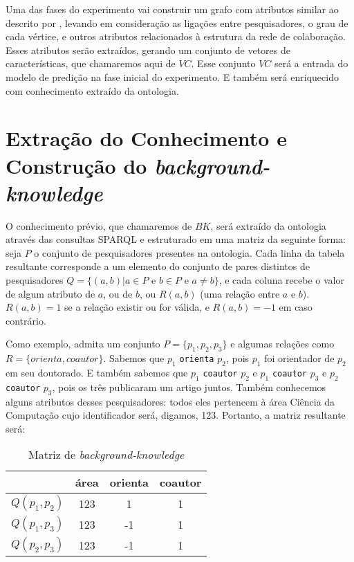 Uma das fases do experimento vai construir um grafo com atributos similar ao descrito por \citet{Cervantes2014}, levando em consideração as ligações entre pesquisadores, o grau de cada vértice, e outros atributos relacionados à estrutura da rede de colaboração. Esses atributos serão extraídos, gerando um conjunto de vetores de características, que chamaremos aqui de $VC$. Esse conjunto $VC$ será a entrada do modelo de predição na fase inicial do experimento. E também será enriquecido com conhecimento extraído da ontologia.

\section{Extração do Conhecimento e Construção do \textit{background-knowledge}}
\label{sec:desenvolvimento-background-knowledge}

O conhecimento prévio, que chamaremos de $BK$, será extraído da ontologia através das consultas SPARQL e estruturado em uma matriz da seguinte forma: seja $P$ o conjunto de pesquisadores presentes na ontologia. Cada linha da tabela resultante corresponde a um elemento do conjunto de pares distintos de pesquisadores $Q = \{ (a, b) | a \in P \text{ e } b \in P \text{ e } a \neq b \}$, e cada coluna recebe o valor de algum atributo de $a$, ou de $b$, ou $R(a,b)$ (uma relação entre $a$ e $b$). $R(a,b) = 1$ se a relação existir ou for válida, e $R(a,b) = -1$ em caso contrário.

Como exemplo, admita um conjunto $P = \{ p_1, p_2, p_3 \}$ e algumas relações como $R = \{ orienta, coautor \}$. Sabemos que $p_1$ \texttt{orienta} $p_2$, pois $p_1$ foi orientador de $p_2$ em seu doutorado. E também sabemos que $p_1$ \texttt{coautor} $p_2$ e $p_1$ \texttt{coautor} $p_3$ e $p_2$ \texttt{coautor} $p_3$, pois os três publicaram um artigo juntos. Também conhecemos alguns atributos desses pesquisadores: todos eles pertencem à área Ciência da Computação cujo identificador será, digamos, 123. Portanto, a matriz resultante será:

\begin{table}[h!]
    \centering
    \begin{tabular}{|c|c|c|c|}
     \hline
      & área & orienta & coautor   \\
     \hline\hline
     $Q(p_1, p_2)$ & 123 & 1  & 1  \\
     \hline
     $Q(p_1, p_3)$ & 123 & -1 & 1  \\
     \hline
     $Q(p_2, p_3)$ & 123 & -1 & 1  \\
     \hline
    \end{tabular}
    \caption{Matriz de \textit{background-knowledge} }
    \label{matriz-relacoes}
\end{table}

